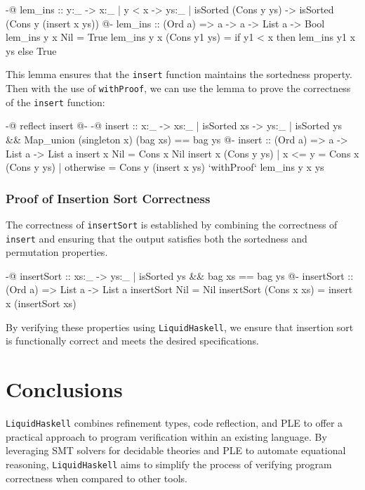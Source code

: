 \documentclass[]{rptuseminar}
\begin{document}
\begin{haskell}
{-@ lem_ins :: y:_ -> {x:_ | y < x} -> {ys:_ | isSorted (Cons y ys)} 
    -> {isSorted (Cons y (insert x ys))} @-}
lem_ins :: (Ord a) => a -> a -> List a -> Bool
lem_ins y x Nil = True
lem_ins y x (Cons y1 ys) = if y1 < x then lem_ins y1 x ys else True
\end{haskell}

This lemma ensures that the \texttt{insert} function maintains the sortedness property.
Then with the use of \texttt{withProof}, we can use the lemma to prove the correctness of the \texttt{insert} function:

\begin{haskell}
{-@ reflect insert @-}
{-@ insert :: x:_ -> {xs:_ | isSorted xs} 
  -> {ys:_ | isSorted ys && Map_union (singleton x) (bag xs) == bag ys  } @-}
insert :: (Ord a) => a -> List a -> List a
insert x Nil = Cons x Nil
insert x (Cons y ys)
  | x <= y = Cons x (Cons y ys)
  | otherwise = Cons y (insert x ys) `withProof` lem_ins y x ys
\end{haskell}

\subsubsection{Proof of Insertion Sort Correctness}

The correctness of \texttt{insertSort} is established by combining the correctness of \texttt{insert} and ensuring that the output satisfies 
both the sortedness and permutation properties.

\begin{haskell}
{-@ insertSort :: xs:_ -> {ys:_ | isSorted ys && bag xs == bag ys} @-}
insertSort :: (Ord a) => List a -> List a
insertSort Nil = Nil
insertSort (Cons x xs) = insert x (insertSort xs)
\end{haskell}

By verifying these properties using \texttt{LiquidHaskell}, we ensure that insertion 
sort is functionally correct and meets the desired specifications.

\section{Conclusions}

\texttt{LiquidHaskell} combines refinement types, code reflection, and PLE to offer a practical approach to program verification within an existing language. By leveraging SMT solvers for decidable theories and PLE to automate equational reasoning, \texttt{LiquidHaskell} aims to simplify the process of verifying program correctness when compared to other tools.
\label{sec:conclusions}
\newpage
\end{document}
